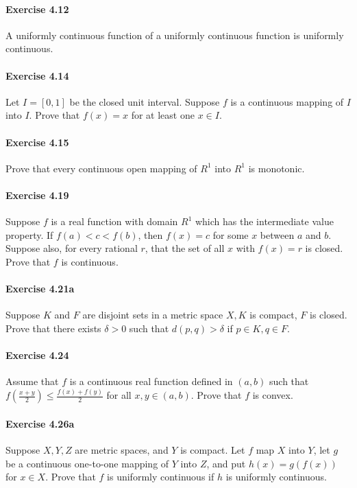\documentclass{article}
\begin{document}
\paragraph{Exercise 4.12} A uniformly continuous function of a uniformly continuous function is uniformly continuous.

\paragraph{Exercise 4.14} Let $I=[0,1]$ be the closed unit interval. Suppose $f$ is a continuous mapping of $I$ into $I$. Prove that $f(x)=x$ for at least one $x \in I$.

\paragraph{Exercise 4.15} Prove that every continuous open mapping of $R^{1}$ into $R^{1}$ is monotonic.

\paragraph{Exercise 4.19} Suppose $f$ is a real function with domain $R^{1}$ which has the intermediate value property. If $f(a)<c<f(b)$, then $f(x)=c$ for some $x$ between $a$ and $b$. Suppose also, for every rational $r$, that the set of all $x$ with $f(x)=r$ is closed. Prove that $f$ is continuous.

\paragraph{Exercise 4.21a} Suppose $K$ and $F$ are disjoint sets in a metric space $X, K$ is compact, $F$ is closed. Prove that there exists $\delta>0$ such that $d(p, q)>\delta$ if $p \in K, q \in F$.

\paragraph{Exercise 4.24} Assume that $f$ is a continuous real function defined in $(a, b)$ such that $f\left(\frac{x+y}{2}\right) \leq \frac{f(x)+f(y)}{2}$ for all $x, y \in(a, b)$. Prove that $f$ is convex.

\paragraph{Exercise 4.26a} Suppose $X, Y, Z$ are metric spaces, and $Y$ is compact. Let $f$ map $X$ into $Y$, let $g$ be a continuous one-to-one mapping of $Y$ into $Z$, and put $h(x)=g(f(x))$ for $x \in X$. Prove that $f$ is uniformly continuous if $h$ is uniformly continuous.
\end{document}
